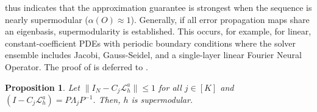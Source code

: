 \documentclass{article} %
\newtheorem{proposition}[theorem]{Proposition}
\begin{document}

 thus indicates that the approximation guarantee is strongest when the sequence is nearly supermodular ($\alpha(O) \approx 1$). Generally, if all error propagation maps share an eigenbasis,
supermodularity is established.
This occurs, for example, for linear, constant-coefficient PDEs with periodic boundary conditions where the solver ensemble includes Jacobi, Gauss-Seidel, and  a single-layer linear Fourier Neural Operator. 
The proof of  is deferred to .
\begin{proposition} \label{th:simultaneoussupermodular}
    Let $\|I_N - C_j\mathcal{L}_h^a\| \leq 1$ for all $j \in [K]$ and $\left(I - C_j \mathcal{L}_{h}^a\right) = P\Lambda_jP^{-1}$. Then, $h$ is supermodular. 
\end{proposition}
\end{document}
